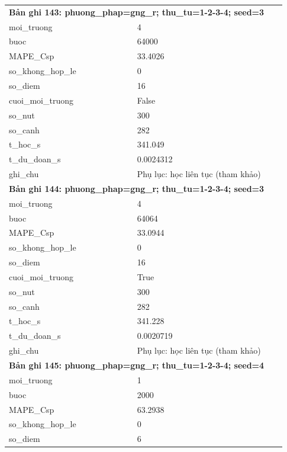 \begin{longtable}{p{0.43\linewidth}p{0.50\linewidth}}
\midrule
\multicolumn{2}{p{0.95\linewidth}}{\textbf{Bản ghi 143: phuong\_phap=gng\_r; thu\_tu=1-2-3-4; seed=3}} \\
moi\_\allowbreak truong & 4 \\
buoc & 64000 \\
MAPE\_\allowbreak Csp & 33.4026 \\
so\_\allowbreak khong\_\allowbreak hop\_\allowbreak le & 0 \\
so\_\allowbreak diem & 16 \\
cuoi\_\allowbreak moi\_\allowbreak truong & False \\
so\_\allowbreak nut & 300 \\
so\_\allowbreak canh & 282 \\
t\_\allowbreak hoc\_\allowbreak s & 341.049 \\
t\_\allowbreak du\_\allowbreak doan\_\allowbreak s & 0.0024312 \\
ghi\_\allowbreak chu & Phụ lục: học liên tục (tham khảo) \\
\midrule
\multicolumn{2}{p{0.95\linewidth}}{\textbf{Bản ghi 144: phuong\_phap=gng\_r; thu\_tu=1-2-3-4; seed=3}} \\
moi\_\allowbreak truong & 4 \\
buoc & 64064 \\
MAPE\_\allowbreak Csp & 33.0944 \\
so\_\allowbreak khong\_\allowbreak hop\_\allowbreak le & 0 \\
so\_\allowbreak diem & 16 \\
cuoi\_\allowbreak moi\_\allowbreak truong & True \\
so\_\allowbreak nut & 300 \\
so\_\allowbreak canh & 282 \\
t\_\allowbreak hoc\_\allowbreak s & 341.228 \\
t\_\allowbreak du\_\allowbreak doan\_\allowbreak s & 0.0020719 \\
ghi\_\allowbreak chu & Phụ lục: học liên tục (tham khảo) \\
\midrule
\multicolumn{2}{p{0.95\linewidth}}{\textbf{Bản ghi 145: phuong\_phap=gng\_r; thu\_tu=1-2-3-4; seed=4}} \\
moi\_\allowbreak truong & 1 \\
buoc & 2000 \\
MAPE\_\allowbreak Csp & 63.2938 \\
so\_\allowbreak khong\_\allowbreak hop\_\allowbreak le & 0 \\
so\_\allowbreak diem & 6 \\

\end{longtable}
